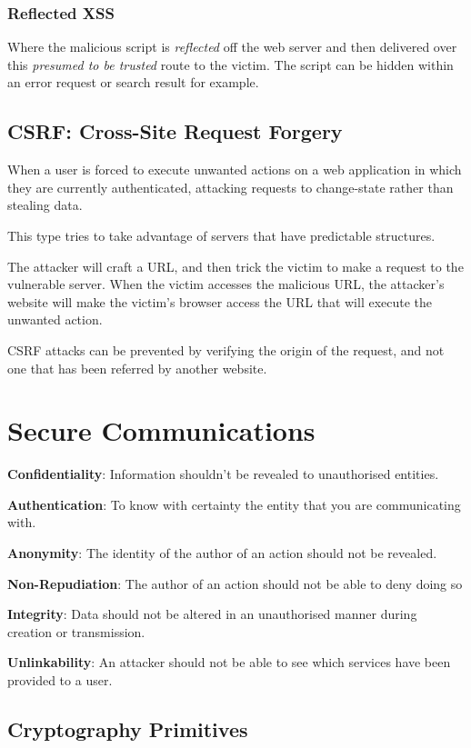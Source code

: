 \documentclass{article}
\begin{document}
\subsubsection{Reflected XSS}

Where the malicious script is \textit{reflected} off the web server and then delivered over this \textit{presumed to be trusted} route to the victim. The script can be hidden within an error request or search result for example.

\subsection{CSRF: Cross-Site Request Forgery}

When a user is forced to execute unwanted actions on a web application in which they are currently authenticated, attacking requests to change-state rather than stealing data.

This type tries to take advantage of servers that have predictable structures.

The attacker will craft a URL, and then trick the victim to make a request to the vulnerable server. When the victim accesses the malicious URL, the attacker's website will make the victim's browser access the URL that will execute the unwanted action.

CSRF attacks can be prevented by verifying the origin of the request, and not one that has been referred by another website.

\section{Secure Communications}

\textbf{Confidentiality}: Information shouldn't be revealed to unauthorised entities.

\textbf{Authentication}: To know with certainty the entity that you are communicating with.

\textbf{Anonymity}: The identity of the author of an action should not be revealed.

\textbf{Non-Repudiation}: The author of an action should not be able to deny doing so

\textbf{Integrity}: Data should not be altered in an unauthorised manner during creation or transmission.

\textbf{Unlinkability}: An attacker should not be able to see which services have been provided to a user.

\subsection{Cryptography Primitives}
\end{document}
